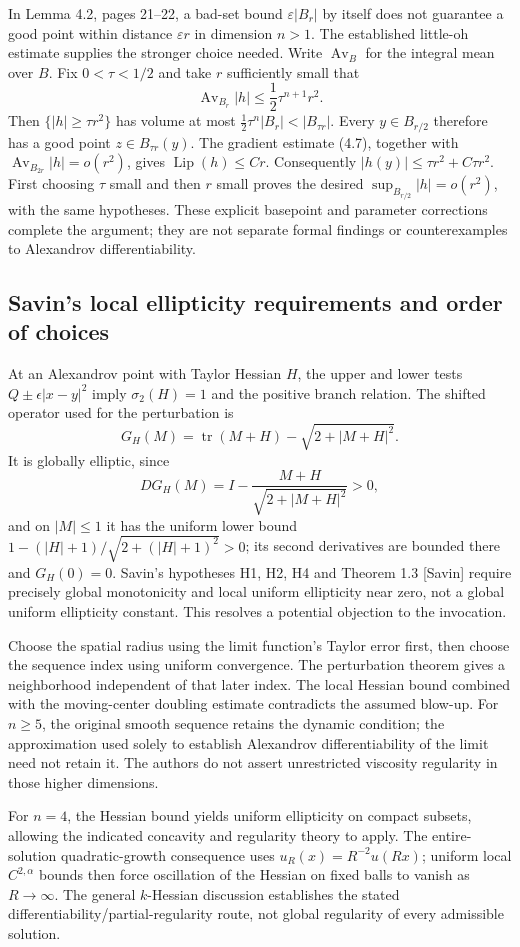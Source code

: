 \documentclass[10pt]{article}
\begin{document}
In Lemma 4.2, pages 21–22, a bad-set bound \(\varepsilon|B_r|\) by itself does not guarantee a good point within distance \(\varepsilon r\) in dimension \(n>1\). The established little-oh estimate supplies the stronger choice needed. Write \(\operatorname{Av}_B\) for the integral mean over \(B\). Fix \(0<\tau<1/2\) and take \(r\) sufficiently small that \[\operatorname{Av}_{B_r}|h|\le\frac12\tau^{n+1}r^2.\] Then \(\{|h|\ge\tau r^2\}\) has volume at most \(\tfrac12\tau^n|B_r|<|B_{\tau r}|\). Every \(y\in B_{r/2}\) therefore has a good point \(z\in B_{\tau r}(y)\). The gradient estimate (4.7), together with \(\operatorname{Av}_{B_{2r}}|h|=o(r^2)\), gives \(\operatorname{Lip}(h)\le Cr\). Consequently \(|h(y)|\le\tau r^2+C\tau r^2\). First choosing \(\tau\) small and then \(r\) small proves the desired \(\sup_{B_{r/2}}|h|=o(r^2)\), with the same hypotheses. These explicit basepoint and parameter corrections complete the argument; they are not separate formal findings or counterexamples to Alexandrov differentiability.\par
\subsection*{Savin’s local ellipticity requirements and order of choices}
At an Alexandrov point with Taylor Hessian \(H\), the upper and lower tests \(Q\pm\epsilon|x-y|^2\) imply \(\sigma_2(H)=1\) and the positive branch relation. The shifted operator used for the perturbation is \[G_H(M)=\operatorname{tr}(M+H)-\sqrt{2+|M+H|^2}.\] It is globally elliptic, since \[DG_H(M)=I-\frac{M+H}{\sqrt{2+|M+H|^2}}>0,\] and on \(|M|\le1\) it has the uniform lower bound \(1-(|H|+1)/\sqrt{2+(|H|+1)^2}>0\); its second derivatives are bounded there and \(G_H(0)=0\). Savin’s hypotheses H1, H2, H4 and Theorem 1.3 [Savin] require precisely global monotonicity and local uniform ellipticity near zero, not a global uniform ellipticity constant. This resolves a potential objection to the invocation.\par
Choose the spatial radius using the limit function’s Taylor error first, then choose the sequence index using uniform convergence. The perturbation theorem gives a neighborhood independent of that later index. The local Hessian bound combined with the moving-center doubling estimate contradicts the assumed blow-up. For \(n\ge5\), the original smooth sequence retains the dynamic condition; the approximation used solely to establish Alexandrov differentiability of the limit need not retain it. The authors do not assert unrestricted viscosity regularity in those higher dimensions.\par
For \(n=4\), the Hessian bound yields uniform ellipticity on compact subsets, allowing the indicated concavity and regularity theory to apply. The entire-solution quadratic-growth consequence uses \(u_R(x)=R^{-2}u(Rx)\); uniform local \(C^{2,\alpha}\) bounds then force oscillation of the Hessian on fixed balls to vanish as \(R\to\infty\). The general \(k\)-Hessian discussion establishes the stated differentiability/partial-regularity route, not global regularity of every admissible solution.\par
\end{document}
